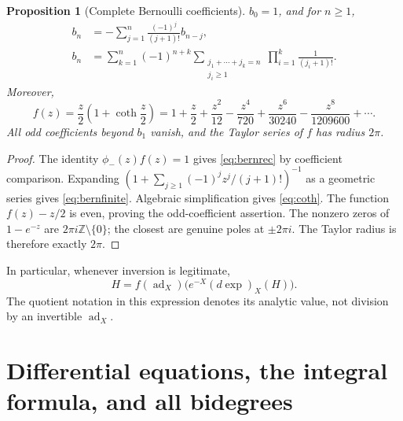 \documentclass[11pt]{article}
\numberwithin{equation}{section}
\newtheorem{proposition}[proposition]{Proposition}
\theoremstyle{definition}
\theoremstyle{remark}
\DeclareMathOperator{\ad}{ad}
\newcommand{\Z}{\mathbb{Z}}
\begin{document}
\begin{proposition}[Complete Bernoulli coefficients]\label{prop:bernoulli}
$b_0=1$, and for $n\geq1$,
\begin{align}
 b_n&=-\sum_{j=1}^n\frac{(-1)^j}{(j+1)!}b_{n-j},\label{eq:bernrec}\\
 b_n&=\sum_{k=1}^n(-1)^{n+k}
 \sum_{\substack{j_1+\cdots+j_k=n\\j_i\geq1}}
 \prod_{i=1}^k\frac1{(j_i+1)!}.\label{eq:bernfinite}
\end{align}
Moreover,
\begin{equation}\label{eq:coth}
 f(z)=\frac z2\left(1+\coth\frac z2\right)
 =1+\frac z2+\frac{z^2}{12}-\frac{z^4}{720}
   +\frac{z^6}{30240}-\frac{z^8}{1209600}+\cdots.
\end{equation}
All odd coefficients beyond $b_1$ vanish, and the Taylor series of $f$
has radius $2\pi$.
\end{proposition}
\begin{proof}
The identity $\phi_-(z)f(z)=1$ gives \eqref{eq:bernrec} by coefficient
comparison. Expanding
$(1+\sum_{j\geq1}(-1)^jz^j/(j+1)!)^{-1}$ as a geometric series gives
\eqref{eq:bernfinite}. Algebraic simplification gives \eqref{eq:coth}.
The function $f(z)-z/2$ is even, proving the odd-coefficient assertion.
The nonzero zeros of $1-e^{-z}$ are $2\pi i\Z\setminus\{0\}$;
the closest are genuine poles at $\pm2\pi i$. The Taylor radius is
therefore exactly $2\pi$.
\end{proof}
In particular, whenever inversion is legitimate,
\begin{equation}\label{eq:inversedexp}
 H=f(\ad_X)\bigl(e^{-X}(d\exp)_X(H)\bigr).
\end{equation}
The quotient notation in this expression denotes its analytic value,
not division by an invertible $\ad_X$.

\section{Differential equations, the integral formula, and all bidegrees}
\label{sec:differentialbch}
\end{document}

